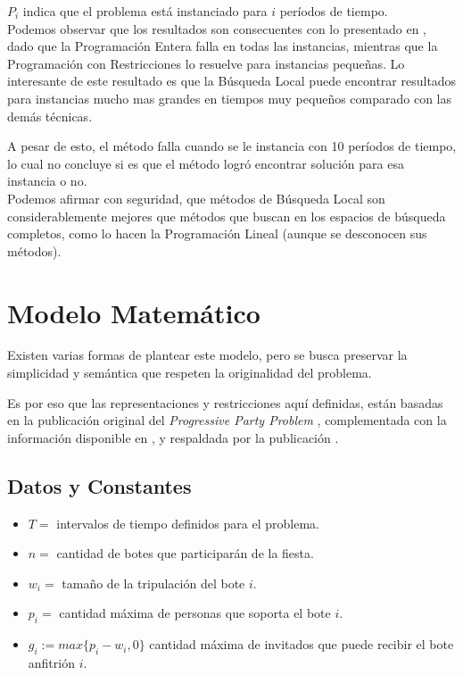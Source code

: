\documentclass[letter, 10pt]{article}
\begin{document}
$P_i$ indica que el problema está instanciado para $i$ períodos de tiempo.\\

Podemos observar que los resultados son consecuentes con lo presentado en \cite{FirstPublication}, dado que la Programación Entera falla en todas las instancias, mientras que la Programación con Restricciones lo resuelve para instancias pequeñas. Lo interesante de este resultado es que la Búsqueda Local puede encontrar resultados para instancias mucho mas grandes en tiempos muy pequeños comparado con las demás técnicas.

A pesar de esto, el método falla cuando se le instancia con 10 períodos de tiempo, lo cual no concluye si es que el método logró encontrar solución para esa instancia o no.\\

Podemos afirmar con seguridad, que métodos de Búsqueda Local son considerablemente mejores que métodos que buscan en los espacios de búsqueda completos, como lo hacen la Programación Lineal (aunque se desconocen sus métodos).

\section{Modelo Matemático}
Existen varias formas de plantear este modelo, pero se busca preservar la simplicidad y semántica que respeten la originalidad del problema.

Es por eso que las representaciones y restricciones aquí definidas, están basadas en la publicación original del \textit{Progressive Party Problem} \cite{FirstPublication}, complementada con la información disponible en \cite{CustomizingSearch}, y respaldada por la publicación \cite{PPPAsMIP}.\\



\subsection{Datos y Constantes}
\begin{itemize}
\item $T =$ intervalos de tiempo definidos para el problema.
\item $n =$ cantidad de botes que participarán de la fiesta.
\item $w_i =$ tamaño de la tripulación del bote $i$.
\item $p_i =$ cantidad máxima de personas que soporta el bote $i$.
\item $g_i := max\{p_i-w_i,0\}$ cantidad máxima de invitados que puede recibir el bote anfitrión $i$.
\end{itemize}
\end{document}
